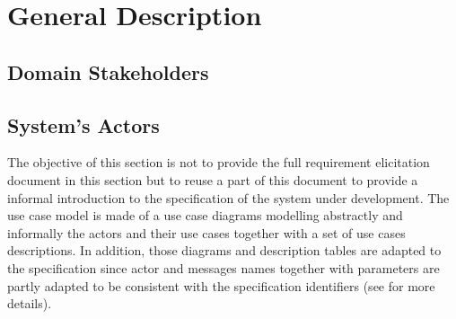 
\chapter{General Description}
\label{chap:general_description}


\section{Domain Stakeholders}
\label{sec:icrash-gendescr-stakeholders}

\newpage

\section{System's Actors}
\label{sec:icrash-gendescr-actors}


The objective of this section is not to provide the full requirement elicitation document in this section but to reuse a part of this document to provide a informal introduction to the \msrmessir specification of the system under development. The use case model is made of a use case diagrams modelling abstractly and informally the actors and their use cases together with a set of use cases descriptions. 
In addition, those diagrams and description tables are adapted to the \msrmessir specification since actor and messages names together with parameters are partly adapted to be consistent with the specification identifiers (see \cite{messirbook} for more details). 


